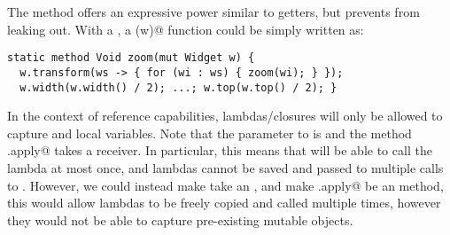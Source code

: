 The \Q@transform@ method offers an expressive power similar to \Q@mut@ getters, but prevents \Q@Widgets@ from leaking out.  With a \Q@Transformer@, a \Q@zoom(w)@ function could be simply written as:
\begin{lstlisting}
static method Void zoom(mut Widget w) {
  w.transform(ws -> { for (wi : ws) { zoom(wi); } });
  w.width(w.width() / 2); ...; w.top(w.top() / 2); }
\end{lstlisting}

In the context of reference capabilities, \Q@imm@ lambdas/closures will only be allowed to capture \Q@imm@ and \Q@capsule@ local variables.
Note that the \Q@Transformer@ parameter to \Q@transform@ is \Q@capsule@ and the method \Q@Trasformer.apply@ takes a \Q@capsule@ receiver. In particular, this means that \Q@transform@ will be able to call the lambda at most once,
and lambdas cannot be saved and passed to multiple calls to \Q@transform@.
However, we could instead make \Q@transform@ take an \Q@imm@ \Q@Transformer@, and make \Q@Transformer.apply@ be an \Q@imm@ method, this would allow lambdas to be freely copied and called multiple times, however they would not be able to capture pre-existing mutable objects.

